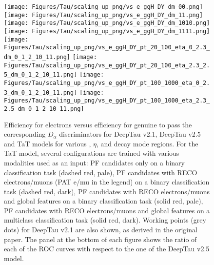 \begin{figure}[H]
    \centering
    \texttt{[image: Figures/Tau/scaling\_up\_png/vs\_e\_ggH\_DY\_dm\_00.png]}
    \texttt{[image: Figures/Tau/scaling\_up\_png/vs\_e\_ggH\_DY\_dm\_11.png]}
    \texttt{[image: Figures/Tau/scaling\_up\_png/vs\_e\_ggH\_DY\_dm\_1010.png]}
    \texttt{[image: Figures/Tau/scaling\_up\_png/vs\_e\_ggH\_DY\_dm\_1111.png]}
    \texttt{[image: Figures/Tau/scaling\_up\_png/vs\_e\_ggH\_DY\_pt\_20\_100\_eta\_0\_2.3\_dm\_0\_1\_2\_10\_11.png]}
    \texttt{[image: Figures/Tau/scaling\_up\_png/vs\_e\_ggH\_DY\_pt\_20\_100\_eta\_2.3\_2.5\_dm\_0\_1\_2\_10\_11.png]}
    \texttt{[image: Figures/Tau/scaling\_up\_png/vs\_e\_ggH\_DY\_pt\_100\_1000\_eta\_0\_2.3\_dm\_0\_1\_2\_10\_11.png]}
    \texttt{[image: Figures/Tau/scaling\_up\_png/vs\_e\_ggH\_DY\_pt\_100\_1000\_eta\_2.3\_2.5\_dm\_0\_1\_2\_10\_11.png]}
    \caption{Efficiency for electrons versus efficiency for genuine \tauh to pass the corresponding $D_\alpha$ discriminators for DeepTau v2.1, DeepTau v2.5 and TaT models for various \pt, $\eta$, and \tauh decay mode regions. For the TaT model, several configurations are trained with various modalities used as an input: PF candidates only on a binary classification task (dashed red, pale), PF candidates with RECO electrons/muons (PAT e/mu in the legend) on a binary classification task (dashed red, dark), PF candidates with RECO electrons/muons and global features on a binary classification task (solid red, pale), PF candidates with RECO electrons/muons and global features on a multiclass classification task (solid red, dark). Working points (grey dots) for DeepTau v2.1 are also shown, as derived in the original paper. The panel at the bottom of each figure shows the ratio of each of the ROC curves with respect to the one of the DeepTau v2.5 model.}
\end{figure}

